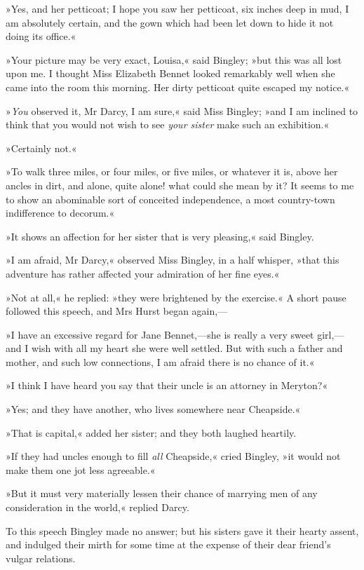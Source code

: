 »Yes, and her petticoat; I hope you saw her petticoat, six inches deep in mud, I am absolutely certain, and the gown which had been let down to hide it not doing its office.«

»Your picture may be very exact, Louisa,« said Bingley; »but this was all lost upon me. I thought Miss Elizabeth Bennet looked remarkably well when she came into the room this morning. Her dirty petticoat quite escaped my notice.«

»\textit{You} observed it, Mr Darcy, I am sure,« said Miss Bingley; »and I am inclined to think that you would not wish to see \textit{your sister} make such an exhibition.«

»Certainly not.«

»To walk three miles, or four miles, or five miles, or whatever it is, above her ancles in dirt, and alone, quite alone! what could she mean by it? It seems to me to show an abominable sort of conceited independence, a most country-town indifference to decorum.«

»It shows an affection for her sister that is very pleasing,« said Bingley.

»I am afraid, Mr Darcy,« observed Miss Bingley, in a half whisper, »that this adventure has rather affected your admiration of her fine eyes.«

»Not at all,« he replied: »they were brightened by the exercise.« A short pause followed this speech, and Mrs Hurst began again,—

»I have an excessive regard for Jane Bennet,—she is really a very sweet girl,—and I wish with all my heart she were well settled. But with such a father and mother, and such low connections, I am afraid there is no chance of it.«

»I think I have heard you say that their uncle is an attorney in Meryton?«

»Yes; and they have another, who lives somewhere near Cheapside.«

»That is capital,« added her sister; and they both laughed heartily.

»If they had uncles enough to fill \textit{all} Cheapside,« cried Bingley, »it would not make them one jot less agreeable.«

»But it must very materially lessen their chance of marrying men of any consideration in the world,« replied Darcy.

To this speech Bingley made no answer; but his sisters gave it their hearty assent, and indulged their mirth for some time at the expense of their dear friend's vulgar relations.

